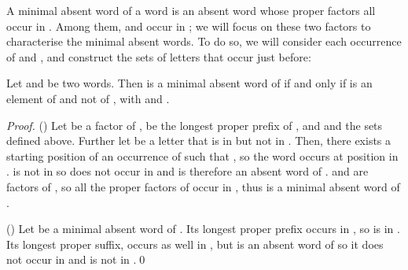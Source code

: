 \documentclass{llncs}
\begin{document}
  A minimal absent word  of a word  is an absent word whose proper factors all occur in .
  Among them,  and  occur in ; we will focus on these two factors to characterise the minimal absent words.
  To do so, we will consider each occurrence of  and , and construct the sets of letters that occur just before:


\begin{lemma}
\label{lem:f1}
  Let  and  be two words. Then  is a minimal absent word of  if and only if  is an element of  and not of , with  and .
\end{lemma}
\begin{proof}
    () Let  be a factor of ,  be the longest proper prefix of , and  and  the sets defined above.
          Further let  be a letter that is in  but not in . Then, there exists a starting position  of an occurrence of 
      such that , so the word  occurs at position  in . 
           is not in  so  does not occur in  and is therefore an absent word of .
           and  are factors of , so all the proper factors of  occur in , thus  is a minimal absent word of .
          
    () Let  be a minimal absent word of . Its longest proper prefix  occurs in , so
       is in . Its longest proper suffix,  occurs as well in , but  is an absent word of  so it does not occur in  and 
       is not in .\qed
\end{proof}
\end{document}
